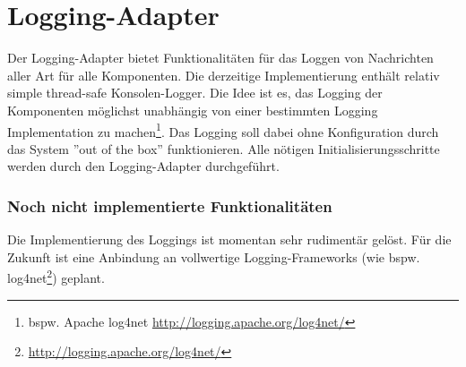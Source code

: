 \section{Logging-Adapter}


Der Logging-Adapter bietet Funktionalitäten für das Loggen von Nachrichten aller Art für alle Komponenten. Die derzeitige Implementierung enthält relativ simple thread-safe Konsolen-Logger. Die Idee ist es, das Logging der Komponenten möglichst unabhängig von einer bestimmten Logging Implementation zu machen\footnote{bspw. Apache log4net \url{http://logging.apache.org/log4net/}}. Das Logging soll dabei ohne Konfiguration durch das System ''out of the box'' funktionieren. Alle nötigen Initialisierungsschritte werden durch den Logging-Adapter durchgeführt. 

\subsubsection{Noch nicht implementierte Funktionalitäten}

Die Implementierung des Loggings ist momentan sehr rudimentär gelöst. Für die Zukunft ist eine Anbindung an vollwertige Logging-Frameworks (wie bspw. log4net\footnote{\url{http://logging.apache.org/log4net/}}) geplant.